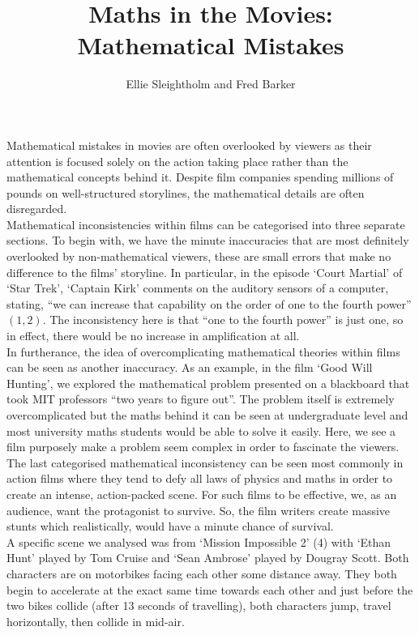 \documentclass{article}
\begin{document}
 
 \title{Maths in the Movies: Mathematical Mistakes}
 \author{Ellie Sleightholm and Fred Barker} 
 \maketitle
 \noindent Mathematical mistakes in movies are often overlooked by viewers as their attention is focused solely on the action taking place rather than the mathematical concepts behind it. Despite film companies spending millions of pounds on well-structured storylines, the mathematical details are often disregarded.\\[5pt]
Mathematical inconsistencies within films can be categorised into three separate sections. To begin with, we have the minute inaccuracies that are most definitely overlooked by non-mathematical viewers, these are small errors that make no difference to the films' storyline. In particular, in the episode ‘Court Martial’ of ‘Star Trek’, ‘Captain Kirk’ comments on the auditory sensors of a computer, stating, “we can increase that capability on the order of one to the fourth power” $(1,2)$. The inconsistency here is that “one to the fourth power” is just one, so in effect, there would be no increase in amplification at all.\\[5pt]
In furtherance, the idea of overcomplicating mathematical theories within films can be seen as another inaccuracy. As an example, in the film ‘Good Will Hunting’, we explored the mathematical problem presented on a blackboard that took MIT professors “two years to figure out”. The problem itself is extremely overcomplicated but the maths behind it can be seen at undergraduate level and most university maths students would be able to solve it easily. Here, we see a film purposely make a problem seem complex in order to fascinate the viewers.\\[5pt]
The last categorised mathematical inconsistency can be seen most commonly in action films where they tend to defy all laws of physics and maths in order to create an intense, action-packed scene. For such films to be effective, we, as an audience, want the protagonist to survive. So, the film writers create massive stunts which realistically, would have a minute chance of survival.\\[5pt]
A specific scene we analysed was from ‘Mission Impossible 2’ (4) with ‘Ethan Hunt’ played by Tom Cruise and ‘Sean Ambrose’ played by Dougray Scott. Both characters are on motorbikes facing each other some distance away. They both begin to accelerate at the exact same time towards each other and just before the two bikes collide (after 13 seconds of travelling), both characters jump, travel horizontally, then collide in mid-air.\\[5pt]
\end{document}
